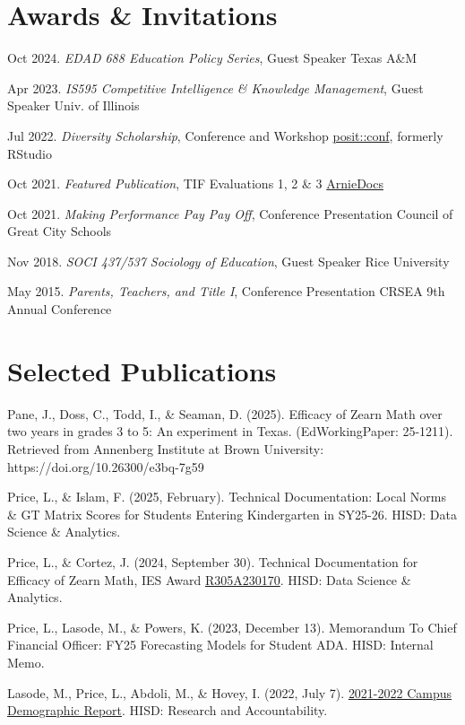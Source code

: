 \documentclass[
  11pt,
]
{article}
\begin{document}
\section{Awards \& Invitations}\label{awards-invitations}

Oct 2024. \emph{EDAD 688 Education Policy Series}, Guest Speaker
\hfill Texas A\&M

Apr 2023. \emph{IS595 Competitive Intelligence \& Knowledge Management},
Guest Speaker \hfill Univ. of Illinois

Jul 2022. \emph{Diversity Scholarship}, Conference and Workshop
\hfill \href{https://posit.co/conference/faq/}{posit::conf}, formerly
RStudio

Oct 2021. \emph{Featured Publication}, TIF Evaluations 1, 2 \& 3
\hfill \href{https://www.arniedocs.info/}{ArnieDocs}

Oct 2021. \emph{Making Performance Pay Pay Off}, Conference Presentation
\hfill Council of Great City Schools

Nov 2018. \emph{SOCI 437/537 Sociology of Education}, Guest Speaker
\hfill Rice University

May 2015. \emph{Parents, Teachers, and Title I}, Conference Presentation
\hfill CRSEA 9th Annual Conference

\section{Selected Publications}\label{selected-publications}

Pane, J., Doss, C., Todd, I., \& Seaman, D. (2025). Efficacy of Zearn
Math over two years in grades 3 to 5: An experiment in Texas.
(EdWorkingPaper: 25-1211). Retrieved from Annenberg Institute at Brown
University: https://doi.org/10.26300/e3bq-7g59

Price, L., \& Islam, F. (2025, February). Technical Documentation: Local
Norms \& GT Matrix Scores for Students Entering Kindergarten in SY25-26.
HISD: Data Science \& Analytics.

Price, L., \& Cortez, J. (2024, September 30). Technical Documentation
for Efficacy of Zearn Math, IES Award
\href{https://ies.ed.gov/funding/grantsearch/details.asp?ID=5835}{R305A230170}.
HISD: Data Science \& Analytics.

Price, L., Lasode, M., \& Powers, K. (2023, December 13). Memorandum To
Chief Financial Officer: FY25 Forecasting Models for Student ADA. HISD:
Internal Memo.

Lasode, M., Price, L., Abdoli, M., \& Hovey, I. (2022, July 7).
\href{https://tx01001591.schoolwires.net/site/handlers/filedownload.ashx?moduleinstanceid=392028&dataid=424429&FileName=Campus\%20Demographic\%20Report\%202021-2022.pdf}{2021-2022
Campus Demographic Report}. HISD: Research and Accountability.
\end{document}
